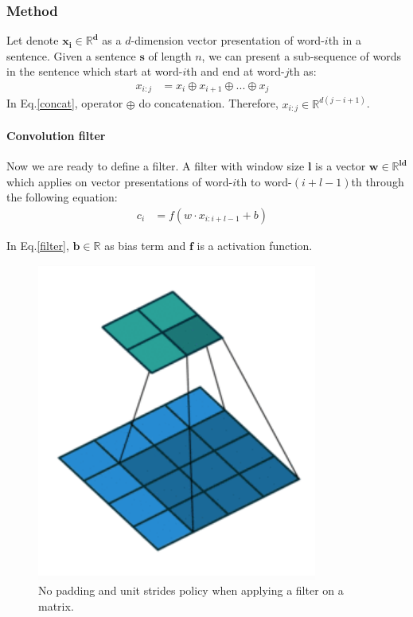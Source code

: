 \subsubsection{Method}
Let denote \(\bm{x_i \in \mathbb{R}^d}\) as a \(d\)-dimension vector presentation of word-\(i\)th in a sentence. 
Given a sentence \(\bm{s}\) of length \(n\), we can present a sub-sequence of words in the sentence which start at word-\(i\)th and end at word-\(j\)th as:
\begin{align}
    x_{i:j} &= x_i \oplus x_{i+1} \oplus ... \oplus x_{j} &\label{concat}
\end{align}
In Eq.\eqref{concat}, operator \(\bm{\oplus}\) do concatenation. Therefore, \(x_{i:j} \in \mathbb{R}^{d(j-i+1)}\). 

\paragraph{Convolution filter} \label{conv-filter} Now we are ready to define a filter. 
A filter with window size \(\bm{l}\) is a vector \(\bm{w \in \mathbb{R}^{ld}}\) which applies on vector presentations of word-\(i\)th to word-\((i+l-1)\)th through the following equation:
\begin{align}
    c_i &= f(w \cdot x_{i:i+l-1} + b) &\label{filter}
\end{align}

In Eq.\eqref{filter}, \(\bm{b \in \mathbb{R}}\) as bias term and \(\bm{f}\) is a activation function. 

\begin{figure}[H]
    \centering
    \includegraphics[scale=0.4]{figure/no_padding}
    \caption[Convolution filter policy]{No padding and unit strides policy when applying a filter on a matrix.}
    \label{fig:no_padding}
\end{figure}

